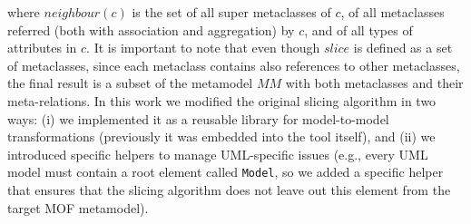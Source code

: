 \noindent where $neighbour(c)$ is the set of all super metaclasses of
$c$, of all metaclasses referred (both with association and
aggregation) by $c$, and of all types of attributes in $c$.
It is important to note that even though $slice$ is defined
as a set of metaclasses, since each metaclass contains also references
to other metaclasses, the final result is a subset of the metamodel $MM$
with both metaclasses and their meta-relations. In this work we modified the original slicing algorithm in two ways:
(i) we implemented it as a reusable library for model-to-model transformations (previously it was embedded into
the tool itself), and (ii) we introduced specific helpers to manage UML-specific issues (e.g.,
every UML model must contain a root element called \texttt{Model}, so we added a specific helper that ensures that the slicing
algorithm does not leave out this element from the target MOF metamodel).

